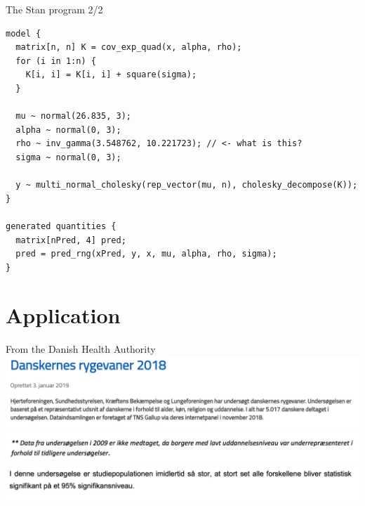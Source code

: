 \documentclass[ignorenonframetext,xcolor=pdflatex,table,dvipsnames,serif]{beamer}
\begin{document}
\begin{frame}[fragile]{The Stan program 2/2}
\begin{Verbatim}[fontsize=\scriptsize]
model {
  matrix[n, n] K = cov_exp_quad(x, alpha, rho);
  for (i in 1:n) {
    K[i, i] = K[i, i] + square(sigma);
  }
  
  mu ~ normal(26.835, 3);
  alpha ~ normal(0, 3);
  rho ~ inv_gamma(3.548762, 10.221723); // <- what is this?
  sigma ~ normal(0, 3);

  y ~ multi_normal_cholesky(rep_vector(mu, n), cholesky_decompose(K));
}

generated quantities {
  matrix[nPred, 4] pred;
  pred = pred_rng(xPred, y, x, mu, alpha, rho, sigma);
}
\end{Verbatim}
\end{frame}


\section{Application}

\begin{frame}{From the Danish Health Authority\footnotemark}
\center\includegraphics[scale=0.38]{rygereSST1.png}
\center\includegraphics[scale=0.42]{rygereSST2.png}
\center\includegraphics[scale=0.344]{rygereSST3.png}
\end{frame}
\end{document}
